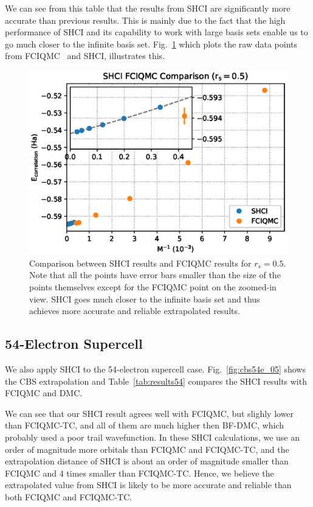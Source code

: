 We can see from this table that the results from SHCI are significantly more accurate than previous results.
This is mainly due to the fact that the high performance of SHCI and its capability to work with large basis sets enable us to go much closer to the infinite basis set. Fig.~\ref{fig:comparison} which plots the raw data points from FCIQMC~\cite{shepherd2012full} and SHCI, illustrates this.
\begin{figure}
  \begin{center}
  \includegraphics[width=\linewidth]{figs/compare.eps}
  \end{center}
  \vspace{-0.2cm}
  \caption{Comparison between SHCI results and FCIQMC results for $r_s=0.5$.
  Note that all the points have error bars smaller than the size of the points themselves except for the FCIQMC point on the zoomed-in view.
  SHCI goes much closer to the infinite basis set and thus achieves more accurate and reliable extrapolated results.
  }
  \label{fig:comparison}
\end{figure}

\subsection{54-Electron Supercell}
We also apply SHCI to the 54-electron supercell case.
Fig.~\ref{fig:cbs54e_05} shows the CBS extrapolation and Table~\ref{tab:results54} compares the SHCI results with FCIQMC and DMC.

We can see that our SHCI result agrees well with FCIQMC, but slighly lower than FCIQMC-TC, and all of them are much higher then BF-DMC, which probably used a poor trail wavefunction.
In these SHCI calculations, we use an order of magnitude more orbitals than FCIQMC and FCIQMC-TC, and the extrapolation distance of SHCI is about an order of magnitude smaller than FCIQMC and 4 times smaller than FCIQMC-TC.
Hence, we believe the extrapolated value from SHCI is likely to be more accurate and reliable than both FCIQMC and FCIQMC-TC.

